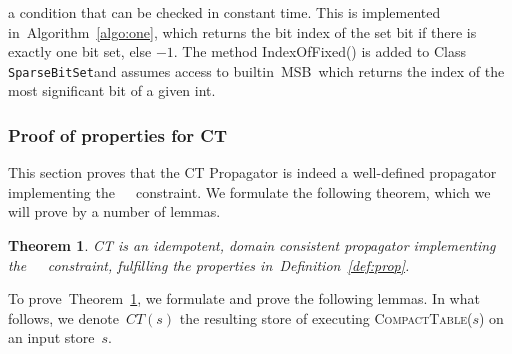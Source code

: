 \documentclass[a4paper,11pt]{article}
\newtheorem{theorem}{Theorem}[section]
\newcommand{\Algoref}[1]{Algorithm~\ref{#1}}
\newcommand{\Table}{\Constraint{Table}~}
\newcommand{\Defref}[1]{Definition~\ref{#1}}
\newcommand{\Thmref}[1]{Theorem~\ref{#1}}
\newcommand{\SparseBitSet}{\texttt{SparseBitSet}}
\def\CompactTable{\textsc{CompactTable}}
\def\FixDomains{\textsc{FixDomains}}
\numberwithin{equation}{section}
\begin{document}
\begin{description}
\noindent
a condition that can be checked in constant time.
This is implemented in~\Algoref{algo:one}, which returns
the bit index of the set bit if there is exactly one bit set, else $-1$.
The method IndexOfFixed() is added to Class \SparseBitSet and assumes access to
builtin~\textsc{MSB}~which returns the index of the most significant bit of a given int.

\begin{algorithm}[H]
  \begin{algorithmic}[1]  %
    
  \end{algorithmic}
  \caption{Checking if exactly one bit is set in \SparseBitSet.}
  \label{algo:one}
\end{algorithm}

\end{description}

%     

\subsubsection{Proof of properties for CT}
\label{sec:proof}
This section proves that the CT Propagator is indeed a well-defined propagator
implementing the~\Table~constraint. We formulate the following theorem, which
we will prove by a number of lemmas.

\begin{theorem} \label{thm:prop}
  CT is an idempotent, domain consistent propagator implementing 
  the~\Table~constraint, fulfilling the properties in~\Defref{def:prop}.
\end{theorem}

To prove~\Thmref{thm:prop}, we formulate and prove the following lemmas.
In what follows, we denote~$CT(s)$ the resulting store of executing
\CompactTable($s$) on an input store~$s$.
\end{document}
